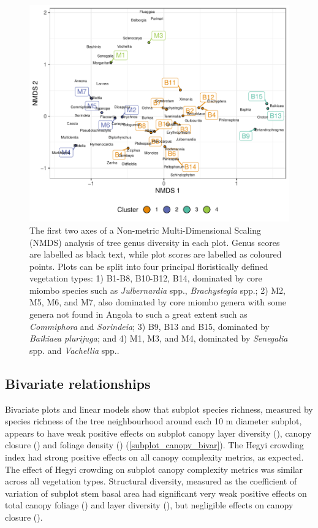 \documentclass[11pt,a4paper]{article}
\begin{document}
\begin{figure}
	\includegraphics[width=\linewidth]{nmds}
	\caption[NMDS of plots based on genera basal area abundance]{The first two axes of a Non-metric Multi-Dimensional Scaling (NMDS) analysis of tree genus diversity in each plot. Genus scores are labelled as black text, while plot scores are labelled as coloured points. Plots can be split into four principal floristically defined vegetation types: 1) B1-B8, B10-B12, B14, dominated by core miombo species such as \textit{Julbernardia} spp., \textit{Brachystegia} spp.; 2) M2, M5, M6, and M7, also dominated by core miombo genera with some genera not found in Angola to such a great extent such as \textit{Commiphora} and \textit{Sorindeia}; 3) B9, B13 and B15, dominated by \textit{Baikiaea plurijuga}; and 4) M1, M3, and M4, dominated by \textit{Senegalia} spp. and \textit{Vachellia} spp..}
	\label{nmds}
\end{figure}

\subsection{Bivariate relationships}

Bivariate plots and linear models show that subplot species richness, measured by species richness of the tree neighbourhood around each 10 m diameter subplot, appears to have weak positive effects on subplot canopy layer diversity (\richLayerDiv{}), canopy closure (\richCover{}) and foliage density (\richFoliage{}) (\autoref{subplot_canopy_bivar}). The Hegyi crowding index had strong positive effects on all canopy complexity metrics, as expected. The effect of Hegyi crowding on subplot canopy complexity metrics was similar across all vegetation types. Structural diversity, measured as the coefficient of variation of subplot stem basal area had significant very weak positive effects on total canopy foliage (\baCovFoliage{}) and layer diversity (\baCovLayerDiv{}), but negligible effects on canopy closure (\baCovCover). 
\end{document}
